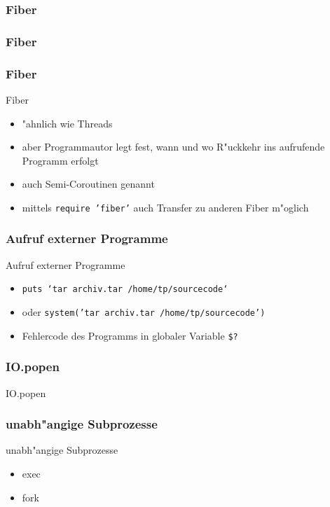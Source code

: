 \documentclass{beamer}
\begin{document}
\lstset{language=Ruby}
\lstset{basicstyle=\small,numbers=none, numberstyle=\tiny, numbersep=5pt}
\begin{frame}
  \frametitle{Fiber}
  
\end{frame}

\begin{frame}
  \frametitle{Fiber}
  
\end{frame}

\begin{frame}
  \frametitle{Fiber}
  Fiber
  \begin{itemize}
    \item "ahnlich wie Threads
    \item aber Programmautor legt fest, wann und wo R"uckkehr ins aufrufende Programm erfolgt
    \item auch Semi-Coroutinen genannt
    \item mittels \texttt{require 'fiber'} auch Transfer zu anderen Fiber m"oglich
  \end{itemize}
\end{frame}


\begin{frame}
  \frametitle{Aufruf externer Programme}
  Aufruf externer Programme
  \begin{itemize}
    \item \texttt{puts `tar archiv.tar /home/tp/sourcecode`}
    \item oder \texttt{system('tar archiv.tar /home/tp/sourcecode')}
    \item Fehlercode des Programms in globaler Variable \texttt{\$?}
  \end{itemize}
\end{frame}

\begin{frame}
  \frametitle{IO.popen}
  IO.popen
  
\end{frame} 

\begin{frame}
  \frametitle{unabh"angige Subprozesse}
  unabh"angige Subprozesse
  \begin{itemize}
    \item exec
    \item fork
  \end{itemize}
\end{frame}
\end{document}
